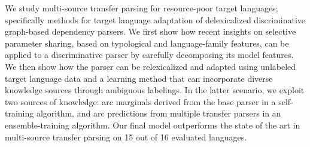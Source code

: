 We study multi-source transfer parsing for resource-poor target languages; specifically methods for target language adaptation of delexicalized
 discriminative graph-based dependency parsers. We first show how recent
 insights on selective parameter sharing, based on typological and
 language-family features, can be applied to a discriminative parser by
 carefully decomposing its model features. We then show how the parser can be
 relexicalized and adapted using unlabeled target language data and a learning
 method that can incorporate diverse knowledge sources through ambiguous
 labelings. In the latter scenario, we exploit two sources of knowledge: arc
 marginals derived from the base parser in a self-training algorithm, and arc
 predictions from multiple transfer parsers in an ensemble-training algorithm.
 Our final model outperforms the state of the art in multi-source transfer
 parsing on 15 out of 16 evaluated languages.

